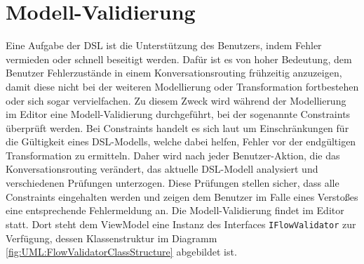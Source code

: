 \section{Modell-Validierung} 
Eine Aufgabe der DSL ist die Unterstützung des Benutzers, indem Fehler vermieden oder schnell beseitigt werden. Dafür ist es von hoher Bedeutung, dem Benutzer Fehlerzustände in einem Konversationsrouting frühzeitig anzuzeigen, damit diese nicht bei der weiteren Modellierung oder Transformation fortbestehen oder sich sogar vervielfachen. Zu diesem Zweck wird während der Modellierung im Editor eine Modell-Validierung durchgeführt, bei der sogenannte Constraints überprüft werden. Bei Constraints handelt es sich laut \cite[S. 82ff, 289ff]{Voelter:13} um Einschränkungen für die Gültigkeit eines DSL-Modells, welche dabei helfen, Fehler vor der endgültigen Transformation zu ermitteln. Daher wird nach jeder Benutzer-Aktion, die das Konversationsrouting verändert, das aktuelle DSL-Modell analysiert und verschiedenen Prüfungen unterzogen. Diese Prüfungen stellen sicher, dass alle Constraints eingehalten werden und zeigen dem Benutzer im Falle eines Verstoßes eine entsprechende Fehlermeldung an.
\newline
Die Modell-Validierung findet im Editor statt. Dort steht dem ViewModel eine Instanz des Interfaces \texttt{IFlowValidator} zur Verfügung, dessen Klassenstruktur im Diagramm \ref{fig:UML:FlowValidatorClassStructure} abgebildet ist.

